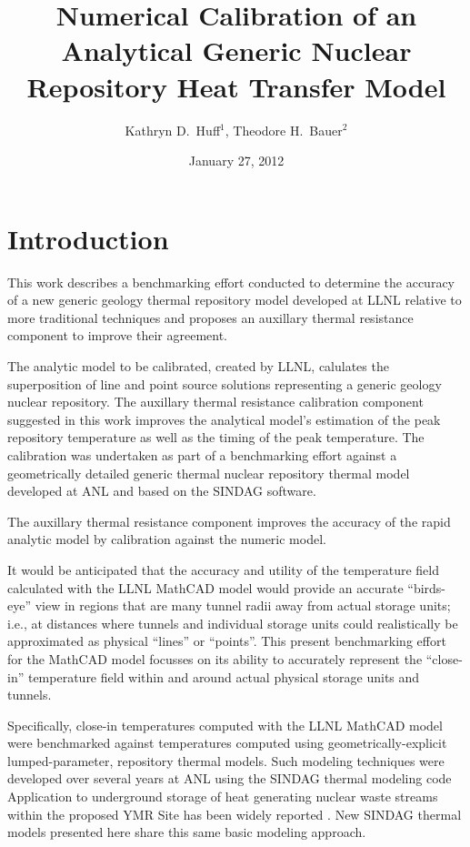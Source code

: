 \documentclass{anstrans}
\title{Numerical Calibration of an Analytical Generic Nuclear Repository Heat 
Transfer Model}
\author{Kathryn D.~Huff$^1$, Theodore H.~Bauer$^2$}
\institute{$^1$Nuclear Engineering \& Engineering Physics Dept., University of 
Wisconsin, Madison, WI, 53706\\
$^2$Nuclear Engineering Division, Argonne National Laboratory, Argonne, IL, 
60439}
\date{January 27, 2012}
\begin{document}
\section{Introduction}

This work describes a benchmarking effort conducted to determine the accuracy of a new
generic geology thermal repository model developed at
\gls{LLNL}\cite{hardin_generic_2011,sutton_investigations_2011,greenberg_application_2012}
relative to more traditional techniques and proposes an auxillary thermal resistance 
component to improve their agreement. 

The analytic model to be calibrated, created by \gls{LLNL}, calulates the 
superposition of line and point source solutions representing a generic geology 
nuclear repository. The auxillary thermal resistance calibration component 
suggested in this work improves the analytical model's estimation of the peak 
repository temperature as well as the timing of the peak temperature. The 
calibration was undertaken as part of a benchmarking effort against a 
geometrically detailed generic thermal nuclear repository thermal model 
developed at \gls{ANL} and based on the \gls{SINDAG} 
software\cite{gaski_sinda_1987,gaski_sindag_1987}.

The auxillary thermal resistance component improves the accuracy of the rapid 
analytic model by calibration against the numeric model. 

It would be anticipated that the accuracy and utility of the temperature field
calculated with the \gls{LLNL} MathCAD model would provide an accurate 
``birds-eye''
view in regions that are many tunnel radii away from actual storage units;
i.e., at distances where tunnels and individual storage units could
realistically be approximated as physical ``lines'' or ``points''. 
This present benchmarking effort for the
MathCAD model focusses on its ability to accurately represent the “close-in”
temperature field within and around actual physical storage units and tunnels. 

Specifically, close-in temperatures computed with the \gls{LLNL} MathCAD model were 
benchmarked against temperatures computed using geometrically-explicit 
lumped-parameter, repository thermal models. Such modeling techniques were 
developed over several years at \gls{ANL} using the \gls{SINDAG} thermal 
modeling code \cite{gaski_sinda_1987}  Application to underground storage of 
heat generating nuclear waste streams within the proposed \gls{YMR} Site has 
been widely reported \cite{wigeland_separations_2006}.  New \gls{SINDAG} thermal 
models presented here share this same basic modeling approach. 
\end{document}
